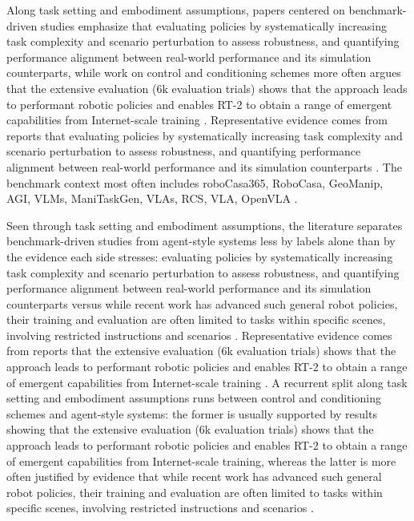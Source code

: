 \documentclass[a4paper,11pt]{article}
\begin{document}
Along task setting and embodiment assumptions, papers centered on benchmark-driven studies emphasize that evaluating policies by systematically increasing task complexity and scenario perturbation to assess robustness, and quantifying performance alignment between real-world performance and its simulation counterparts, while work on control and conditioning schemes more often argues that the extensive evaluation (6k evaluation trials) shows that the approach leads to performant robotic policies and enables RT-2 to obtain a range of emergent capabilities from Internet-scale training \citep{Yang2025Robot,Tang2025Geomanip,Brohan2023Vision,Dong2026Capturing}. Representative evidence comes from reports that evaluating policies by systematically increasing task complexity and scenario perturbation to assess robustness, and quantifying performance alignment between real-world performance and its simulation counterparts \citep{Yang2025Robot}. The benchmark context most often includes roboCasa365, RoboCasa, GeoManip, AGI, VLMs, ManiTaskGen, VLAs, RCS, VLA, OpenVLA \citep{Nasiriany2026Robocasa365,Tang2025Geomanip,Dai2025Manitaskgen,Kachaev2025Mind}.

Seen through task setting and embodiment assumptions, the literature separates benchmark-driven studies from agent-style systems less by labels alone than by the evidence each side stresses: evaluating policies by systematically increasing task complexity and scenario perturbation to assess robustness, and quantifying performance alignment between real-world performance and its simulation counterparts versus while recent work has advanced such general robot policies, their training and evaluation are often limited to tasks within specific scenes, involving restricted instructions and scenarios \citep{Yang2025Robot,Tang2025Geomanip,Dai2025Manitaskgen}. Representative evidence comes from reports that the extensive evaluation (6k evaluation trials) shows that the approach leads to performant robotic policies and enables RT-2 to obtain a range of emergent capabilities from Internet-scale training \citep{Brohan2023Vision}. A recurrent split along task setting and embodiment assumptions runs between control and conditioning schemes and agent-style systems: the former is usually supported by results showing that the extensive evaluation (6k evaluation trials) shows that the approach leads to performant robotic policies and enables RT-2 to obtain a range of emergent capabilities from Internet-scale training, whereas the latter is more often justified by evidence that while recent work has advanced such general robot policies, their training and evaluation are often limited to tasks within specific scenes, involving restricted instructions and scenarios \citep{Brohan2023Vision,Dong2026Capturing,Dai2025Manitaskgen}.
\end{document}
